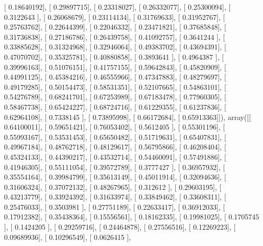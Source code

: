\documentclass{article}
\begin{document}
       [ 0.18640192],
       [ 0.29897715],
       [ 0.23318027],
       [ 0.26332077],
       [ 0.25300094],
       [ 0.3122643 ],
       [ 0.26068679],
       [ 0.23114134],
       [ 0.31769633],
       [ 0.31952767],
       [ 0.25763762],
       [ 0.22644399],
       [ 0.22046332],
       [ 0.23471821],
       [ 0.37685848],
       [ 0.31736838],
       [ 0.27186786],
       [ 0.26439758],
       [ 0.41092757],
       [ 0.3641244 ],
       [ 0.33885628],
       [ 0.31324968],
       [ 0.32946064],
       [ 0.49383702],
       [ 0.43694391],
       [ 0.47070702],
       [ 0.35325781],
       [ 0.40880858],
       [ 0.3893641 ],
       [ 0.4964387 ],
       [ 0.39996163],
       [ 0.51076151],
       [ 0.41757155],
       [ 0.59642843],
       [ 0.45820909],
       [ 0.44991125],
       [ 0.45384216],
       [ 0.46555966],
       [ 0.47347883],
       [ 0.48279697],
       [ 0.49179285],
       [ 0.50154473],
       [ 0.58531351],
       [ 0.52107665],
       [ 0.54863101],
       [ 0.54276789],
       [ 0.68241701],
       [ 0.67253989],
       [ 0.67183478],
       [ 0.77960305],
       [ 0.58467738],
       [ 0.65424227],
       [ 0.68724716],
       [ 0.61229355],
       [ 0.61237836],
       [ 0.62964108],
       [ 0.7338145 ],
       [ 0.73895998],
       [ 0.66172684],
       [ 0.65913363]]), array([[ 0.64100011],
       [ 0.59651421],
       [ 0.76053402],
       [ 0.5612405 ],
       [ 0.55301196],
       [ 0.55993167],
       [ 0.53531453],
       [ 0.65650482],
       [ 0.51719631],
       [ 0.65407831],
       [ 0.49967184],
       [ 0.48762718],
       [ 0.48129617],
       [ 0.56795866],
       [ 0.46208404],
       [ 0.45324133],
       [ 0.44390217],
       [ 0.43532714],
       [ 0.54460091],
       [ 0.57491886],
       [ 0.41946305],
       [ 0.55111054],
       [ 0.39572789],
       [ 0.3777427 ],
       [ 0.36957932],
       [ 0.35554164],
       [ 0.39984799],
       [ 0.35613149],
       [ 0.45011914],
       [ 0.32094636],
       [ 0.31606324],
       [ 0.37072132],
       [ 0.48267965],
       [ 0.312612  ],
       [ 0.29603195],
       [ 0.43213779],
       [ 0.33924392],
       [ 0.31633974],
       [ 0.33849462],
       [ 0.33608311],
       [ 0.25476033],
       [ 0.3503981 ],
       [ 0.27751189],
       [ 0.22633417],
       [ 0.36912033],
       [ 0.17912382],
       [ 0.35438364],
       [ 0.15556561],
       [ 0.18162335],
       [ 0.19981025],
       [ 0.1705745 ],
       [ 0.1424205 ],
       [ 0.29259716],
       [ 0.24464878],
       [ 0.27556516],
       [ 0.12269223],
       [ 0.09689936],
       [ 0.10296549],
       [ 0.0626415 ],
\end{document}

